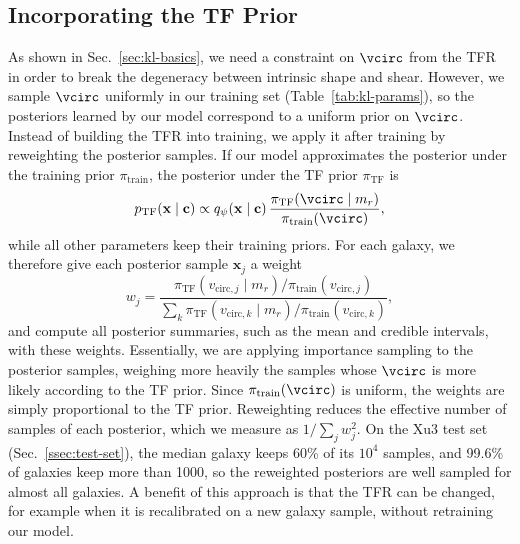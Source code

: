 \subsection{Incorporating the TF Prior}
\label{ssec:tf-prior}
As shown in Sec.~\ref{sec:kl-basics}, we need a constraint on $\vcirc$ from the TFR in order to break the degeneracy between intrinsic shape and shear. However, we sample $\vcirc$ uniformly in our training set (Table~\ref{tab:kl-params}), so the posteriors learned by our model correspond to a uniform prior on $\vcirc$. Instead of building the TFR into training, we apply it after training by reweighting the posterior samples. If our model approximates the posterior under the training prior $\pi_\mathrm{train}$, the posterior under the TF prior $\pi_\mathrm{TF}$ is
\begin{equation}
\label{eqn:tf-reweight}
    p_\mathrm{TF}(\mathbf{x} \mid \mathbf{c}) \propto q_\psi(\mathbf{x} \mid \mathbf{c})\, \frac{\pi_\mathrm{TF}(\vcirc \mid m_r)}{\pi_\mathrm{train}(\vcirc)},
\end{equation}
while all other parameters keep their training priors. For each galaxy, we therefore give each posterior sample $\mathbf{x}_j$ a weight
\begin{equation}
\label{eqn:tf-weights}
    w_j = \frac{\pi_\mathrm{TF}(v_{\mathrm{circ},j} \mid m_r)/\pi_\mathrm{train}(v_{\mathrm{circ},j})}{\sum_k \pi_\mathrm{TF}(v_{\mathrm{circ},k} \mid m_r)/\pi_\mathrm{train}(v_{\mathrm{circ},k})},
\end{equation}
and compute all posterior summaries, such as the mean and credible intervals, with these weights. Essentially, we are applying importance sampling to the posterior samples, weighing more heavily the samples whose $\vcirc$ is more likely according to the TF prior. Since $\pi_\mathrm{train}(\vcirc)$ is uniform, the weights are simply proportional to the TF prior. Reweighting reduces the effective number of samples of each posterior, which we measure as $1/\sum_j w_j^2$. On the Xu3 test set (Sec.~\ref{ssec:test-set}), the median galaxy keeps 60\% of its $10^4$ samples, and 99.6\% of galaxies keep more than 1000, so the reweighted posteriors are well sampled for almost all galaxies. A benefit of this approach is that the TFR can be changed, for example when it is recalibrated on a new galaxy sample, without retraining our model.

